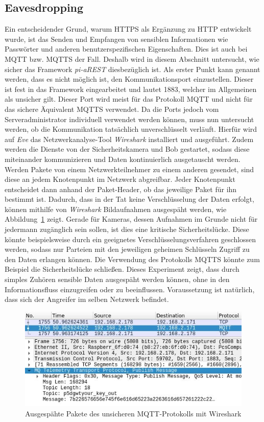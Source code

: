 \subsection{Eavesdropping}
Ein entscheidender Grund, warum HTTPS als Ergänzung zu HTTP entwickelt wurde,
ist das Senden und Empfangen von sensiblen Informationen wie Passwörter und
anderen benutzerspezifischen Eigenschaften. Dies ist auch bei MQTT bzw. MQTTS
der Fall. Deshalb wird in diesem Abschnitt untersucht, wie sicher das Framework
\textit{pi-aREST} diesbezüglich ist. Als erster Punkt kann genannt werden, dass
es nicht möglich ist, den Kommunikationsport einzustellen. Dieser ist fest in
das Framework eingearbeitet und lautet 1883, welcher im Allgemeinen als unsicher
gilt. Dieser Port wird meist für das Protokoll MQTT und nicht für das sichere
Äquivalent MQTTS verwendet. Da die Ports jedoch vom Serveradministrator
individuell verwendet werden können, muss nun untersucht werden, ob die
Kommunikation tatsächlich unverschlüsselt verläuft. Hierfür wird auf
\textit{Eve} das Netzwerkanalyse-Tool \textit{Wireshark} installiert und
ausgeführt. Zudem werden die Dienste von der Sicherheitskamera und Bob
gestartet, sodass diese miteinander kommunizieren und Daten kontinuierlich
ausgetauscht werden. Werden Pakete von einem Netzwerkteilnehmer zu einem anderen
gesendet, sind diese an jedem Knotenpunkt im Netzwerk abgreifbar. Jeder
Knotenpunkt entscheidet dann anhand der Paket-Header, ob das jeweilige Paket für
ihn bestimmt ist. Dadurch, dass in der Tat keine Verschlüsselung der Daten
erfolgt, können mithilfe von \textit{Wireshark} Bildaufnahmen ausgespäht werden,
wie Abbildung~\ref{fig:wireshark} zeigt. Gerade für Kameras, dessen Aufnahmen im
Grunde nicht für jedermann zugänglich sein sollen, ist dies eine kritische
Sicherheitslücke. Diese könnte beispielsweise durch ein geeignetes
Verschlüsselungsverfahren geschlossen werden, sodass nur Parteien mit den
jeweiligen geheimen Schlüsseln Zugriff zu den Daten erlangen können. Die
Verwendung des Protokolls MQTTS könnte zum Beispiel die Sicherheitslücke
schließen. Dieses Experiment zeigt, dass durch simples Zuhören sensible Daten
ausgespäht werden können, ohne in den Informationsfluss einzugreifen oder zu
beeinflussen.  Voraussetzung ist natürlich, dass sich der Angreifer im selben
Netzwerk befindet.

\begin{figure}
  \centerline{\includegraphics[width=\columnwidth]{images/wireshark}}
  \caption{Ausgespähte Pakete des unsicheren MQTT-Protokolls mit Wireshark}
  \label{fig:wireshark}
\end{figure}

